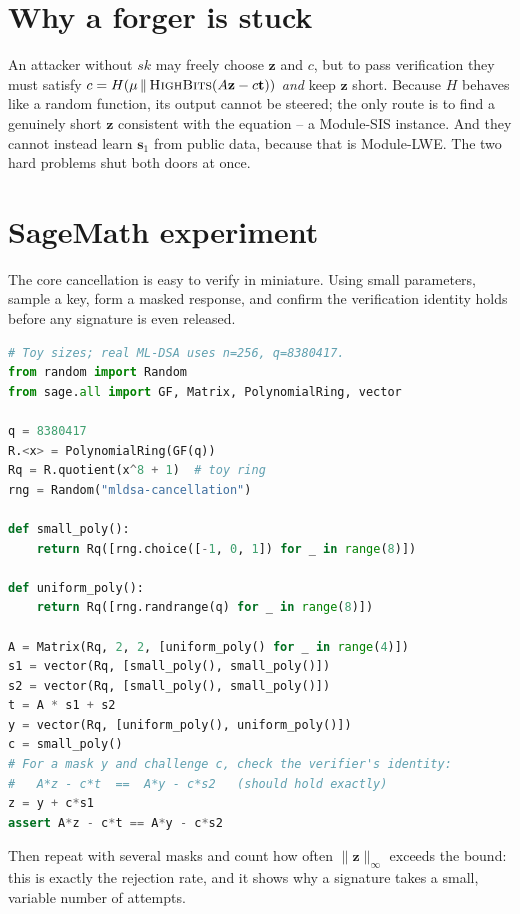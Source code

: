 \section{Why a forger is stuck}

An attacker without $sk$ may freely choose $\mathbf{z}$ and $c$, but to pass verification they must satisfy $c = H(\mu\,\|\,\textsc{HighBits}(A\mathbf{z}-c\mathbf{t}))$ \emph{and} keep $\mathbf{z}$ short. Because $H$ behaves like a random function, its output cannot be steered; the only route is to find a genuinely short $\mathbf{z}$ consistent with the equation -- a Module-SIS instance. And they cannot instead learn $\mathbf{s}_1$ from public data, because that is Module-LWE. The two hard problems shut both doors at once.

\section{SageMath experiment}

The core cancellation is easy to verify in miniature. Using small parameters, sample a key, form a masked response, and confirm the verification identity holds before any signature is even released.

\begin{lstlisting}[language=Python]
# Toy sizes; real ML-DSA uses n=256, q=8380417.
from random import Random
from sage.all import GF, Matrix, PolynomialRing, vector

q = 8380417
R.<x> = PolynomialRing(GF(q))
Rq = R.quotient(x^8 + 1)  # toy ring
rng = Random("mldsa-cancellation")

def small_poly():
    return Rq([rng.choice([-1, 0, 1]) for _ in range(8)])

def uniform_poly():
    return Rq([rng.randrange(q) for _ in range(8)])

A = Matrix(Rq, 2, 2, [uniform_poly() for _ in range(4)])
s1 = vector(Rq, [small_poly(), small_poly()])
s2 = vector(Rq, [small_poly(), small_poly()])
t = A * s1 + s2
y = vector(Rq, [uniform_poly(), uniform_poly()])
c = small_poly()
# For a mask y and challenge c, check the verifier's identity:
#   A*z - c*t  ==  A*y - c*s2   (should hold exactly)
z = y + c*s1
assert A*z - c*t == A*y - c*s2
\end{lstlisting}

Then repeat with several masks and count how often $\|\mathbf{z}\|_\infty$ exceeds the bound: this is exactly the rejection rate, and it shows why a signature takes a small, variable number of attempts.

